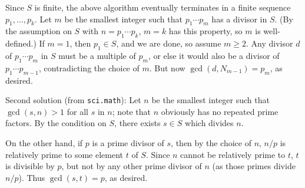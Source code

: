 \documentclass[amssymb,twocolumn,pra,10pt,aps]{revtex4-1}
\begin{document}
\begin{itemize}
Since $S$ is finite, the above algorithm eventually terminates in a finite
sequence $p_1, \dots, p_k$.
Let $m$ be the smallest integer such that $p_1 \cdots p_m$ has a divisor in $S$.
(By the assumption on $S$ with $n=p_1\cdots p_k$,
$m=k$ has this property, so $m$ is well-defined.)
If $m=1$, then $p_1\in S$, and we are done, so assume $m\geq 2$.
Any divisor $d$ of $p_1\cdots p_m$ in $S$ must be a multiple of $p_m$, or else
it would also be a divisor of $p_1 \cdots p_{m-1}$, contradicting the choice
of $m$. But now $\gcd(d, N_{m-1}) = p_m$, as desired.

Second solution (from \texttt{sci.math}):
Let $n$ be the smallest integer such that $\gcd(s,n) > 1$ for all $s$ in
$n$; note that $n$ obviously has no repeated prime factors.
By the condition on $S$, there exists $s \in S$ which divides $n$.

On the other hand, if $p$ is a prime divisor of $s$, then by the choice
of $n$, $n/p$ is relatively prime to some element $t$ of $S$. Since $n$ cannot
be relatively prime to $t$, $t$ is divisible by $p$, but not by any other
prime divisor of $n$ (as those primes divide $n/p$). Thus $\gcd(s,t) = p$,
as desired.

\end{itemize}
\end{document}
